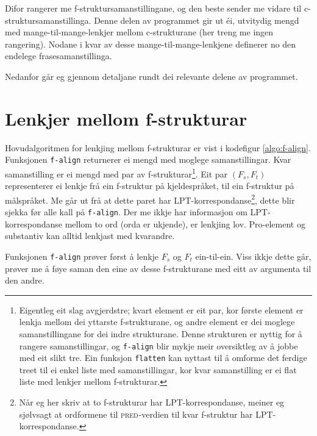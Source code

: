 \documentclass[11pt,a4paper,oneside,draft]{report}
\newcommand{\F}[2]{\textsc{#1}\ensuremath{_{#2}}}
\newcommand{\PRED}{\F{pred}{}}
\begin{document}
Difor rangerer me f-struktursamanstillingane, og den beste sender me
vidare til c-struktursamanstillinga. Denne delen av programmet gir ut
éi, utvitydig mengd med mange-til-mange-lenkjer mellom c-strukturane
(her treng me ingen rangering). Nodane i kvar av desse
mange-til-mange-lenkjene definerer no den endelege
frasesamanstillinga.

Nedanfor går eg gjennom detaljane rundt dei relevante delene av
programmet.

\section{Lenkjer mellom f-strukturar}
\label{sec-4.1}

\label{SEC:impl-f-lenkjing}

Hovudalgoritmen for lenkjing mellom f-strukturar er vist i kodefigur
\ref{algo:f-align}. Funksjonen \texttt{f-align} returnerer ei mengd med
moglege samanstillingar. Kvar samanstilling er ei mengd med par av
f-strukturar\footnote{Eigentleg eit slag avgjerdstre; kvart element er eit par, kor
        første element er lenkja mellom dei yttarste f-strukturane, og
        andre element er dei moglege samanstillingane for dei indre
        strukturane. Denne strukturen er nyttig for å rangere
        samanstillingar, og \texttt{f-align} blir mykje meir oversiktleg av å
        jobbe med eit slikt tre. Ein funksjon \texttt{flatten} kan nyttast
        til å omforme det ferdige treet til ei enkel liste med
        samanstillingar, kor kvar samanstilling er ei flat liste med
        lenkjer mellom f-strukturar. }. Eit par $(F_s,F_t)$ representerer ei lenkje frå
ein f-struktur på kjeldespråket, til ein f-struktur på målspråket. Me
går ut frå at dette paret har LPT-korrespondanse\footnote{Når eg her skriv at to f-strukturar har LPT-korrespondanse,
        meiner eg sjølvsagt at ordformene til \PRED{}-verdien til kvar
        f-struktur har LPT-korrespondanse. }, dette blir
sjekka før alle kall på \texttt{f-align}. Der me ikkje har informasjon om
LPT-korrespondanse mellom to ord (orda er ukjende), er lenkjing
lov. Pro-element og substantiv kan alltid lenkjast med kvarandre.

Funksjonen \texttt{f-align} prøver først å lenkje $F_s$ og $F_t$
ein-til-ein. Viss ikkje dette går, prøver me å føye saman den eine av
desse f-strukturane med eitt av argumenta til den andre. 
\end{document}
